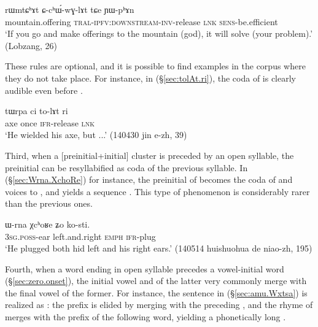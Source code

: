 \begin{exe}
	\ex \label{sec:rWmtChAt.cthWwGlAt}
	\gll  rɯmtɕʰɤt ɕ-cʰɯ́-wɣ-lɤt tɕe ɲɯ-pʰɤn  \\
	mountain.offering \textsc{tral}-\textsc{ipfv}:\textsc{downstream}-\textsc{inv}-release \textsc{lnk} \textsc{sens}-be.efficient   \\
	\glt `If you go and make offerings to the mountain (god), it will solve (your problem).'  (Lobzang, 26)
\end{exe}

These rules are optional, and it is possible to find examples in the corpus where they do not take place. For instance, in (§\ref{sec:tolAt.ri}), the coda  of  is clearly audible even before .

\begin{exe}
	\ex \label{sec:tolAt.ri}
	\gll tɯrpa ci to-lɤt ri \\
	axe once \textsc{ifr}-release \textsc{lnk} \\
	\glt `He wielded his axe, but ...' (140430 jin e-zh, 39)
\end{exe}

Third, when a [preinitial+initial] cluster is preceded by an open syllable, the preinitial can be resyllabified as coda of the previous syllable. In (§\ref{sec:Wrna.XchoRe}) for instance, the preinitial  of  becomes the coda of  and voices to , and yields a sequence . This type of phenomenon is considerably rarer than the previous ones.

\begin{exe}
	\ex \label{sec:Wrna.XchoRe}
	\gll ɯ-rna χcʰoʁe ʑo ko-sti. \\
	\textsc{3sg}.\textsc{poss}-ear left.and.right \textsc{emph} \textsc{ifr}-plug \\
	\glt  `He plugged both hid left and his right ears.' (140514 huishuohua de niao-zh, 195)
\end{exe}

Fourth, when a word ending in open syllable precedes a vowel-initial word (§\ref{sec:zero.onset}), the initial vowel  and  of the latter very commonly merge with the final vowel of the former. For instance, the sentence in (§\ref{sec:amu.Wxtsa}) is realized as : the  prefix is elided by merging with the preceding , and the  rhyme of  merges with the  prefix of the following word, yielding a phonetically long .

